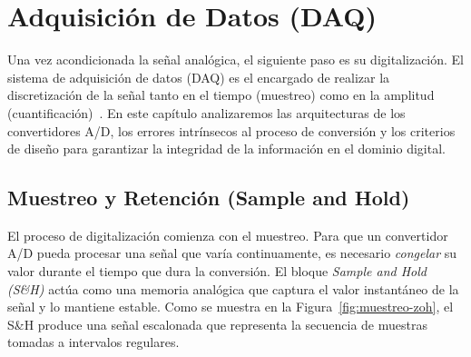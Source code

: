 
\chapter{Adquisición de Datos (DAQ)}\label{cap:daq}


Una vez acondicionada la señal analógica, el siguiente paso es su digitalización. El sistema de adquisición de datos (DAQ) es el encargado de realizar la discretización de la señal tanto en el tiempo (muestreo) como en la amplitud (cuantificación)~\cite{pallasareny2000sensors}. En este capítulo analizaremos las arquitecturas de los convertidores A/D, los errores intrínsecos al proceso de conversión y los criterios de diseño para garantizar la integridad de la información en el dominio digital.


\section{Muestreo y Retención (Sample and Hold)}\label{sec:muestreo}

El proceso de digitalización comienza con el muestreo. Para que un convertidor A/D pueda procesar una señal que varía continuamente, es necesario \emph{congelar} su valor durante el tiempo que dura la conversión. El bloque \emph{Sample and Hold (S\&H)} actúa como una memoria analógica que captura el valor instantáneo de la señal y lo mantiene estable. Como se muestra en la Figura~\ref{fig:muestreo-zoh}, el S\&H produce una señal escalonada que representa la secuencia de muestras tomadas a intervalos regulares. 

